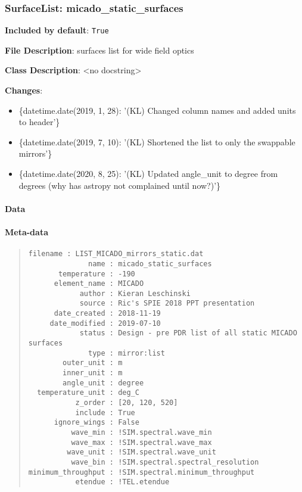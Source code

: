 \subsubsection{SurfaceList: \textquotedbl{}micado\_static\_surfaces\textquotedbl{}%
  \label{surfacelist-micado-static-surfaces}%
}

\textbf{Included by default}: \texttt{True}

\textbf{File Description}: surfaces list for wide field optics

\textbf{Class Description}: <no docstring>

\textbf{Changes}:

\begin{itemize}
\item \{datetime.date(2019, 1, 28): '(KL) Changed column names and added units to header'\}

\item \{datetime.date(2019, 7, 10): '(KL) Shortened the list to only the swappable mirrors'\}

\item \{datetime.date(2020, 8, 25): '(KL) Updated angle\_unit to degree from degrees (why has astropy not complained until now?)'\}
\end{itemize}


\paragraph{Data%
  \label{data}%
}


\paragraph{Meta-data%
  \label{meta-data}%
}

\begin{quote}
\begin{alltt}
\begin{lstlisting}[frame=single]
          filename : LIST_MICADO_mirrors_static.dat
              name : micado_static_surfaces
       temperature : -190
      element_name : MICADO
            author : Kieran Leschinski
            source : Ric's SPIE 2018 PPT presentation
      date_created : 2018-11-19
     date_modified : 2019-07-10
            status : Design - pre PDR list of all static MICADO surfaces
              type : mirror:list
        outer_unit : m
        inner_unit : m
        angle_unit : degree
  temperature_unit : deg_C
           z_order : [20, 120, 520]
           include : True
      ignore_wings : False
          wave_min : !SIM.spectral.wave_min
          wave_max : !SIM.spectral.wave_max
         wave_unit : !SIM.spectral.wave_unit
          wave_bin : !SIM.spectral.spectral_resolution
minimum_throughput : !SIM.spectral.minimum_throughput
           etendue : !TEL.etendue
\end{lstlisting}
\end{alltt}
\end{quote}


